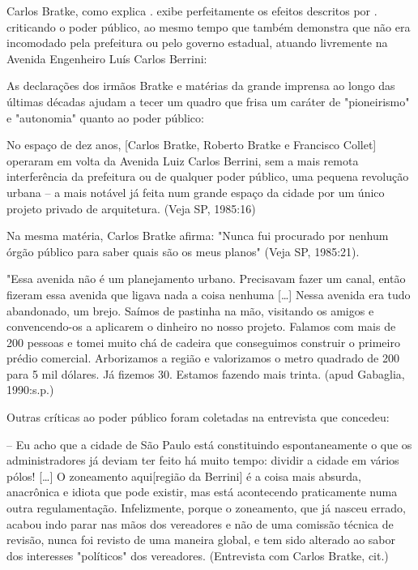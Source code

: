 	Carlos Bratke, como explica . exibe perfeitamente os efeitos descritos por . criticando o poder público, ao mesmo tempo que também demonstra que não era incomodado pela prefeitura ou pelo governo estadual, atuando livremente na Avenida Engenheiro Luís Carlos Berrini:
	
	\begin{citacao}
		As declarações dos irmãos Bratke e matérias da grande imprensa ao longo das últimas décadas ajudam a tecer um quadro que frisa um caráter de "pioneirismo" e "autonomia" quanto ao poder público:
		
		\begin{citacao}
			No espaço de dez anos, [Carlos Bratke, Roberto Bratke e Francisco Collet] operaram em volta da Avenida Luiz Carlos Berrini, sem a mais remota interferência da prefeitura ou de qualquer poder público, uma pequena revolução urbana -- a mais notável já feita num grande espaço da cidade por um único projeto privado de arquitetura. (Veja SP, 1985:16)
		\end{citacao}
		
		Na mesma matéria, Carlos Bratke afirma: "Nunca fui procurado por nenhum órgão público para saber quais são os meus planos" (Veja SP, 1985:21).

		\begin{citacao}		
			"Essa avenida não é um planejamento urbano. Precisavam fazer um canal, então fizeram essa avenida que ligava nada a coisa nenhuma [\dots] Nessa avenida era tudo abandonado, um brejo. Saímos de pastinha na mão, visitando os amigos e convencendo-os a aplicarem o dinheiro no nosso projeto. Falamos com mais de 200 pessoas e tomei muito chá de cadeira que conseguimos construir o primeiro prédio comercial. Arborizamos a região e valorizamos o metro quadrado de 200 para 5 mil dólares. Já fizemos 30. Estamos fazendo mais trinta. (apud Gabaglia, 1990:s.p.)
		\end{citacao}
		
		Outras críticas ao poder público foram coletadas na entrevista que concedeu:
		
		\begin{citacao}
			-- Eu acho que a cidade de São Paulo está constituindo espontaneamente o que os administradores já deviam ter feito há muito tempo: dividir a cidade em vários pólos! [\dots] O zoneamento aqui[região da Berrini] é a coisa mais absurda, anacrônica e idiota que pode existir, mas está acontecendo praticamente numa outra regulamentação. Infelizmente, porque o zoneamento, que já nasceu errado, acabou indo parar nas mãos dos vereadores e não de uma comissão técnica de revisão, nunca foi revisto de uma maneira global, e tem sido alterado ao sabor dos interesses "políticos" dos vereadores. (Entrevista com Carlos Bratke, cit.)
		\end{citacao}
		
	\end{citacao}
	
